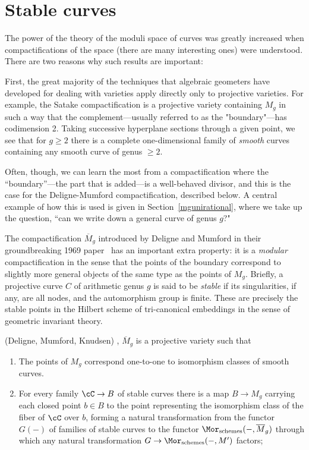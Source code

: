 \section{Stable curves}

The power of the theory of the moduli space of curves was greatly increased when compactifications of the space (there are many interesting ones) were understood. There are two reasons why such results are  important:

First, the great majority of the techniques that algebraic geometers have developed for dealing with varieties apply directly only to projective varieties. For example, the Satake compactification is a projective variety containing $M_g$ in such a way that the complement---usually referred to as the "boundary"---has codimension 2. Taking successive hyperplane sections through a given point, we see that for $g\geq 2$ there is a complete one-dimensional family of \emph{smooth} curves containing any smooth curve of genus $\geq 2$. 

Often, though, we can learn the most from a compactification where the ``boundary''---the part that is added---is a well-behaved divisor, and this is the case for the Deligne-Mumford compactification, described below. A central example of how this is used is given in Section~\ref{mgunirational}, where we take up the question, ``can we write down a general curve of genus $g$?" 

The compactification $\overline M_g$ introduced by Deligne and Mumford in their groundbreaking 1969 paper~\cite{Deligne-Mumford} has an important extra property: it is a \emph{modular}  compactification in the sense that the points of the boundary correspond to slightly more general
objects of the same type as the points of $M_g$. 
Briefly, a projective curve $C$ of arithmetic genus $g$ is said to be \emph{stable} if its singularities, if any, are all nodes, and the automorphism group is finite. These are precisely the stable points in the Hilbert scheme of tri-canonical embeddings in the sense of geometric invariant theory. 

\begin{theorem}(Deligne, Mumford, Knudsen) \cite{Deligne-Mumford}, \cite{MR702954}\label{DM is coarse}
$\overline M_g$ is a projective variety such that
\begin{enumerate}
 \item The points of $M_g$ correspond one-to-one to isomorphism classes of smooth curves.
 \item For every family $\cC \to B$ of stable curves there is a map $B\to M_g$ carrying
 each closed point  $b \in B$ to the point representing the isomorphism class of the fiber of $\cC$ over $b$, 
 forming a natural transformation from the functor $G(-)$ of families of stable curves to the functor 
 $\Mor_{\rm schemes}(-, \overline M_g)$ through which any natural transformation $G \to \Mor_{\rm schemes}(-, M')$
 factors;
\end{enumerate}
\end{theorem}
 
